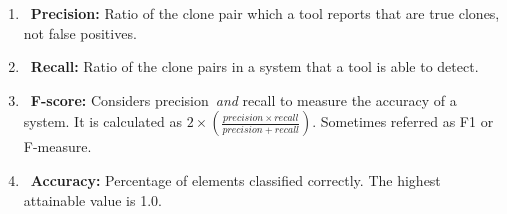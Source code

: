 \documentclass{sig-alternate}
\newcommand{\todo}[1]{\textcolor{cyan}{\textbf{[#1]}}}
\begin{document}
 \begin{enumerate}
  \item~\textbf{Precision:} Ratio of the clone pair which a tool reports that are true clones, not false positives. %

 \item~\textbf{Recall:} Ratio of the clone pairs in a system that a tool is able to detect. %

  \item~\textbf{F-score:} Considers precision~\emph{and} recall to measure the accuracy of a system. It is calculated as $2\times(\frac{precision\times recall}{precision+recall})$. Sometimes referred as F1 or F-measure.

 \item~\textbf{Accuracy:} Percentage of elements classified correctly. The highest attainable value is 1.0. %

\end{enumerate}





\end{document}
